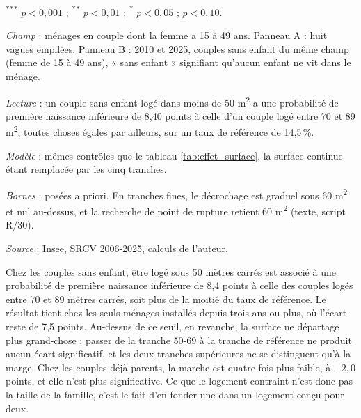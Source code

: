 \documentclass[12pt,a4paper]{article}
\newcommand{\sym}[1]{\textsuperscript{#1}}
\begin{document}
\begin{table}[htbp]
\begin{threeparttable}
\begin{tabular}{lrrrr}
			\bottomrule
		\end{tabular}
		\begin{tablenotes}[flushleft]\scriptsize
			\item \sym{***} $p<0{,}001$ ; \sym{**} $p<0{,}01$ ; \sym{*} $p<0{,}05$ ; \sym{\dag} $p<0{,}10$.
			\item \textit{Champ} : ménages en couple dont la femme a 15 à 49 ans. Panneau A : huit
			vagues empilées. Panneau B : 2010 et 2025, couples sans enfant du même champ (femme de 15 à
			49 ans), « sans enfant » signifiant qu'aucun enfant ne vit dans le ménage.
			\item \textit{Lecture} : un couple sans enfant logé dans moins de 50 m\textsuperscript{2}
			a une probabilité de première naissance inférieure de 8,40 points à celle d'un couple
			logé entre 70 et 89 m\textsuperscript{2}, toutes choses égales par ailleurs, sur un taux
			de référence de 14,5\,\%.
			\item \textit{Modèle} : mêmes contrôles que le tableau \ref{tab:effet_surface}, la surface
			continue étant remplacée par les cinq tranches.
			\item \textit{Bornes} : posées a priori. En tranches fines, le décrochage est graduel sous
			60 m\textsuperscript{2} et nul au-dessus, et la recherche de point de rupture retient
			60 m\textsuperscript{2} (texte, script R/30).
			\item \textit{Source} : Insee, SRCV 2006-2025, calculs de l'auteur.
		\end{tablenotes}
	\end{threeparttable}
\end{table}

\bigskip

\noindent Chez les couples sans enfant, être logé sous 50 mètres carrés est associé à une probabilité de première naissance inférieure de 8,4 points à celle des couples logés entre 70 et 89 mètres carrés, soit plus de la moitié du taux de référence. Le résultat tient chez les seuls ménages installés depuis trois ans ou plus, où l'écart reste de 7,5 points. Au-dessus de ce seuil, en revanche, la surface ne départage plus grand-chose : passer de la tranche 50-69 à la tranche de référence ne produit aucun écart significatif, et les deux tranches supérieures ne se distinguent qu'à la marge. Chez les couples déjà parents, la marche est quatre fois plus faible, à $-2{,}0$ points, et elle n'est plus significative. Ce que le logement contraint n'est donc pas la taille de la famille, c'est le fait d'en fonder une dans un logement conçu pour deux. \\
\end{document}
